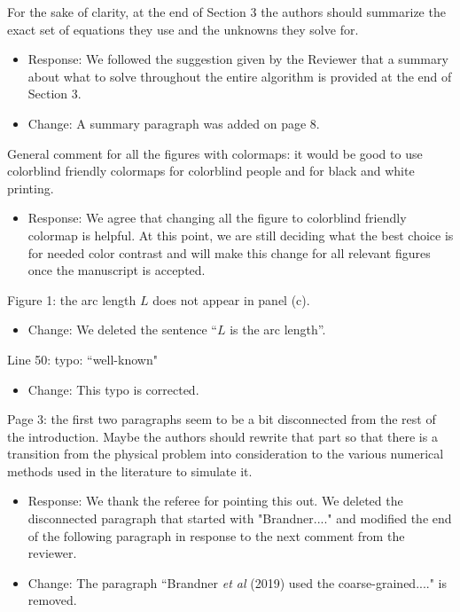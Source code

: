 \documentclass[11pt]{article}
\newcommand{\comment}[1]{{\color{blue} #1}}
\begin{document}
\noindent
\comment{For the sake of clarity, at the end of Section 3 the authors
should summarize the exact set of equations they use and the unknowns
they solve for.}
\begin{itemize}
\item Response: We followed the suggestion given by the
  Reviewer that a summary about what to solve throughout the entire algorithm is provided at the end of Section 3.
  \item Change: A summary paragraph was added on page 8.
\end{itemize}

\noindent
\comment{General comment for all the figures with colormaps: it would be
good to use colorblind friendly colormaps for colorblind people and for
black and white printing.}
\begin{itemize}
\item Response: We agree that changing all the figure 
  to colorblind friendly colormap is helpful.  At this point,
  we are still deciding what the best choice is for needed color
  contrast and will make this change for all relevant figures once the
  manuscript is accepted.
\end{itemize}

\noindent
\comment{Figure 1: the arc length $L$ does not appear in panel (c).}
\begin{itemize}
  \item Change: We deleted the sentence ``$L$ is the arc length''.
\end{itemize}

\noindent
\comment{Line 50: typo: ``well-known"}
\begin{itemize}
  \item Change: This typo is corrected.
\end{itemize}

\noindent
\comment{Page 3: the first two paragraphs seem to be a bit disconnected
from the rest of the introduction. Maybe the authors should rewrite that
part so that there is a transition from the physical problem into
consideration to the various numerical methods used in the literature to
simulate it.}
\begin{itemize}
 \item Response: We thank the referee for pointing this out. We deleted the disconnected paragraph that started with "Brandner...." and modified the end of the following paragraph in response to the next comment from the reviewer.
  \item Change: The paragraph ``Brandner {\it et al} (2019) used the coarse-grained...." is removed.
\end{itemize}
\end{document}
